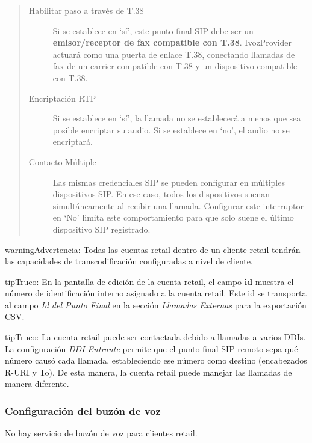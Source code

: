 \documentclass[letterpaper,10pt,spanish]{sphinxmanual}
\begin{document}
\begin{quote}
\begin{description}
\item[{Habilitar paso a través de T.38}] \leavevmode
Si se establece en `sí', este punto final SIP debe ser un \textbf{emisor/receptor de fax compatible con T.38}. IvozProvider actuará como una puerta de enlace T.38, conectando llamadas de fax de un carrier compatible con T.38 y un dispositivo compatible con T.38.

\item[{Encriptación RTP}] \leavevmode
Si se establece en `sí', la llamada no se establecerá a menos que sea posible encriptar su audio. Si se establece en `no', el audio no se encriptará.

\item[{Contacto Múltiple}] \leavevmode
Las mismas credenciales SIP se pueden configurar en múltiples dispositivos SIP. En ese caso, todos los dispositivos suenan simultáneamente al recibir una llamada. Configurar este interruptor en `No' limita este comportamiento para que solo suene el último dispositivo SIP registrado.

\end{description}
\end{quote}

\begin{notice}{warning}{Advertencia:}
Todas las cuentas retail dentro de un cliente retail tendrán las capacidades de transcodificación configuradas a nivel de cliente.
\end{notice}

\begin{notice}{tip}{Truco:}
En la pantalla de edición de la cuenta retail, el campo \textbf{id} muestra el número de identificación interno asignado a la cuenta retail. Este id se transporta al campo \emph{Id del Punto Final} en la sección \emph{Llamadas Externas} para la exportación CSV.
\end{notice}

\begin{notice}{tip}{Truco:}
La cuenta retail puede ser contactada debido a llamadas a varios DDIs. La configuración \emph{DDI Entrante} permite que el punto final SIP remoto sepa qué número causó cada llamada, estableciendo ese número como destino (encabezados R-URI y To). De esta manera, la cuenta retail puede manejar las llamadas de manera diferente.
\end{notice}


\subsubsection{Configuración del buzón de voz}
\label{administration_portal/client/retail/retail_accounts:voicemail-settings}
No hay servicio de buzón de voz para clientes retail.
\end{document}
